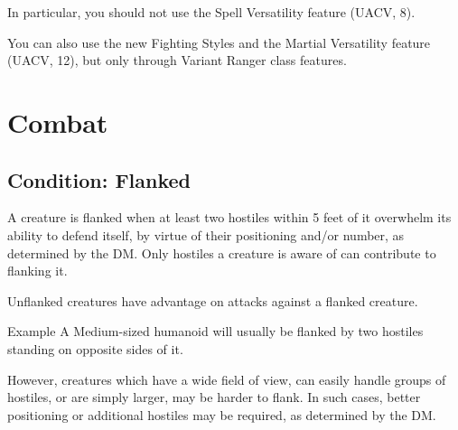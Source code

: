 \documentclass[House_Rules.tex]{subfiles}
\begin{document}
In particular, you should not use the Spell Versatility feature (UACV, 8).

You can also use the new Fighting Styles and the Martial Versatility feature (UACV, 12), but only through Variant Ranger class features.


\section{Combat}


\subsection{Condition: Flanked}
A creature is flanked when at least two hostiles within 5 feet of it overwhelm its ability to defend itself, by virtue of their positioning and/or number, as determined by the DM. Only hostiles a creature is aware of can contribute to flanking it.

Unflanked creatures have advantage on attacks against a flanked creature.

\begin{DndComment}{Example}
A Medium-sized humanoid will usually be flanked by two hostiles standing on opposite sides of it.

However, creatures which have a wide field of view, can easily handle groups of hostiles, or are simply larger, may be harder to flank. In such cases, better positioning or additional hostiles may be required, as determined by the DM.
\end{DndComment}
\end{document}
